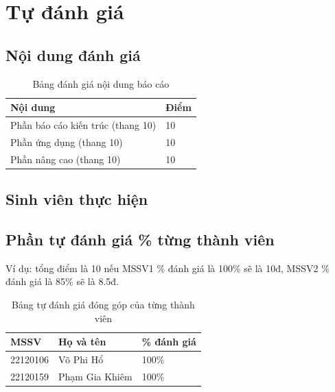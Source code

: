 
\section*{Tự đánh giá}

\subsection*{Nội dung đánh giá}

\begin{table}[H]
\centering
\caption{Bảng đánh giá nội dung báo cáo}
\begin{tabular}{|p{6cm}|p{3cm}|}
\hline
\textbf{Nội dung} & \textbf{Điểm} \\
\hline
Phần báo cáo kiến trúc (thang 10) & 10 \\
\hline
Phần ứng dụng (thang 10) & 10 \\
\hline
Phần nâng cao (thang 10) & 10 \\
\hline
\end{tabular}
\end{table}

\subsection*{Sinh viên thực hiện}

\subsection*{Phần tự đánh giá \% từng thành viên}

\noindent Ví dụ: tổng điểm là 10 nếu MSSV1 \% đánh giá là 100\% sẽ là 10đ, MSSV2 \% đánh giá là 85\% sẽ là 8.5đ.

\begin{table}[H]
\centering
\caption{Bảng tự đánh giá đóng góp của từng thành viên}
\begin{tabular}{|p{2.5cm}|p{5cm}|p{3cm}|}
\hline
\textbf{MSSV} & \textbf{Họ và tên} & \textbf{\% đánh giá} \\
\hline
22120106 & Võ Phi Hổ & 100\% \\
\hline
22120159 & Phạm Gia Khiêm & 100\% \\
\hline
\end{tabular}
\end{table}
